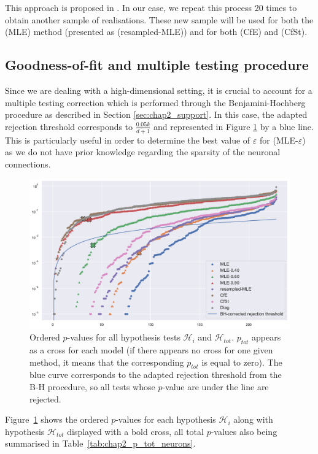 This approach is proposed in \cite[Section 3.4]{Reynaud2014}. In our case, we repeat this process 20 times to obtain another sample of realisations. These new sample will be used for both the (MLE) method (presented as (resampled-MLE)) and for both (CfE) and (CfSt).


\subsection{Goodness-of-fit and multiple testing procedure}

Since we are dealing with a high-dimensional setting, it is crucial to account for a multiple testing correction which is performed through the Benjamini-Hochberg procedure as described in Section \ref{sec:chap2_support}. In this case, the adapted rejection threshold corresponds to $\frac{0.05 k}{d+1}$ and represented in Figure \ref{fig:chap2_p_values_neurons} by a blue line.
This is particularly useful in order to determine the best value of $\varepsilon$ for (MLE-$\varepsilon$) as we do not have prior knowledge regarding the sparsity of the neuronal connections.

{\begin{figure}[!ht]
\centering
\includegraphics[width=0.9\linewidth]{images/chapter3/p_values_conf.pdf}
\caption{Ordered $p$-values for all hypothesis tests $\mathcal{H}_i$ and $\mathcal{H}_{tot}$. $p_{tot}$ appears as a cross for each model (if there appears no cross for one given method, it means that the corresponding $p_{tot}$ is equal to zero). The blue curve corresponds to the adapted rejection threshold from the B-H procedure, so all tests whose $p$-value are under the line are rejected.}
\label{fig:chap2_p_values_neurons}
\end{figure}}

 Figure~\ref{fig:chap2_p_values_neurons} shows the ordered $p$-values for each hypothesis $\mathcal{H}_i$ along with hypothesis $\mathcal{H}_{tot}$ displayed with a bold cross, all total $p$-values also being summarised in Table~\ref{tab:chap2_p_tot_neurons}. 
    
